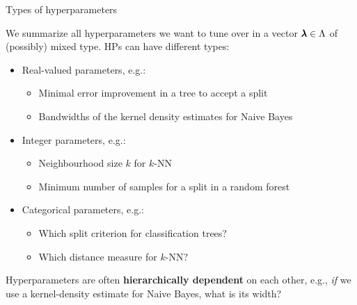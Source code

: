 \begin{frame}{Types of hyperparameters}

We summarize all hyperparameters we want to tune over in a vector $\pmb{\lambda} \in \Lambda$ of (possibly) mixed type. HPs can have different types:

\begin{itemize}
\item Real-valued parameters, e.g.:
\begin{itemize}
\item Minimal error improvement in a tree to accept a split
\item Bandwidths of the kernel density estimates for Naive Bayes
\end{itemize}
\item Integer parameters, e.g.:
\begin{itemize}
\item Neighbourhood size $k$ for $k$-NN
\item Minimum number of samples for a split in a random forest
\end{itemize}
\item Categorical parameters, e.g.:
\begin{itemize}
\item Which split criterion for classification trees?
\item Which distance measure for $k$-NN?
\end{itemize}
\end{itemize}

Hyperparameters are often \textbf{hierarchically dependent} on each other, e.g., \emph{if} we use
a kernel-density estimate for Naive Bayes, what is its width?
\end{frame}

